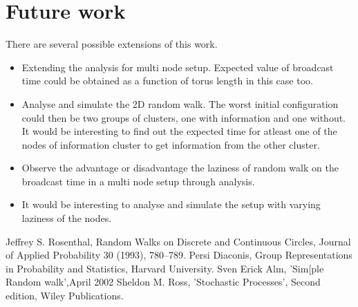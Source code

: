 \documentclass[a4paper,10pt,english]{article}
\begin{document}
\section{Future work}\label{fw}
There are several possible extensions of this work.
\begin{itemize}
	\item Extending the analysis for multi node setup. Expected value of broadcast time could be obtained as a function of torus length in this case too.
	\item Analyse and simulate the 2D random walk. The worst initial configuration could then be two groups of clusters, one with information and one without. It would be interesting to find out the expected time for atleast one of the nodes of information cluster to get information from the other cluster.
	\item Observe the advantage or disadvantage the laziness of random walk on the broadcast time in a multi node setup through analysis. 
	\item It would be interesting to analyse and simulate the setup with varying laziness of the nodes.
\end{itemize}
\begin{thebibliography}{5}
	Jeffrey S. Rosenthal, Random Walks on Discrete and Continuous Circles, Journal of Applied Probability 30 (1993), 780–789.
	Persi Diaconis, Group Representations in Probability and Statistics, Harvard University.
	Sven Erick Alm, 'Sim[ple Random walk',April 2002
	Sheldon M. Ross, 'Stochastic Processes', Second edition, Wiley Publications.
\end{thebibliography}
\end{document}
